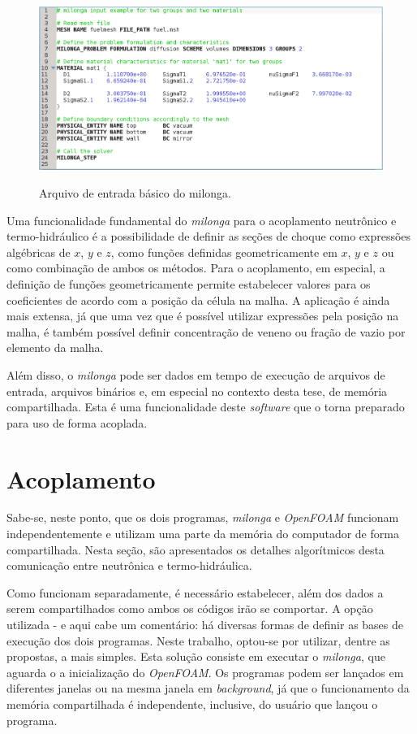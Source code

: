 \begin{figure}[htb]
  \caption{Arquivo de entrada básico do milonga. }
  \centering\includegraphics[scale=0.19]{figuras/milonga_example2.png}
  \label{fig:inputmilonga}
\end{figure}

Uma funcionalidade fundamental do \textit{milonga} para o acoplamento neutrônico
e termo-hidráulico é a possibilidade de definir as seções de choque como expressões
algébricas de $x$, $y$ e $z$, como funções definidas geometricamente em $x$, $y$ e $z$
ou como combinação de ambos os métodos. Para o acoplamento, em especial, a definição
de funções geometricamente permite estabelecer valores para os coeficientes de
acordo com a posição da célula na malha. A aplicação é ainda mais extensa, já que
uma vez que é possível utilizar expressões pela posição na malha, é também
possível definir concentração de veneno ou fração de vazio por elemento da malha.

Além disso, o \textit{milonga} pode ser dados em tempo de execução de arquivos de
entrada, arquivos binários e, em especial no contexto desta tese, de memória compartilhada.
Esta é uma funcionalidade deste \textit{software} que o torna preparado para uso de
forma acoplada.


\section{Acoplamento}
\label{sec:acoplamento}

Sabe-se, neste ponto, que os dois programas, \textit{milonga} e \textit{OpenFOAM} funcionam
independentemente e utilizam uma parte da memória do computador de forma compartilhada.
Nesta seção, são apresentados os detalhes algorítmicos desta comunicação entre neutrônica e
termo-hidráulica.

Como funcionam separadamente, é necessário estabelecer, além dos dados a serem compartilhados
como ambos os códigos irão se comportar. A opção utilizada - e aqui cabe um comentário: há diversas
formas de definir as bases de execução dos dois programas. Neste trabalho, optou-se por utilizar,
dentre as propostas, a mais simples. Esta solução consiste em executar o \textit{milonga}, que aguarda
o a inicialização do \textit{OpenFOAM}. Os programas podem ser lançados em diferentes janelas ou
na mesma janela em \textit{background}, já que o funcionamento da memória compartilhada é independente,
inclusive, do usuário que lançou o programa.


